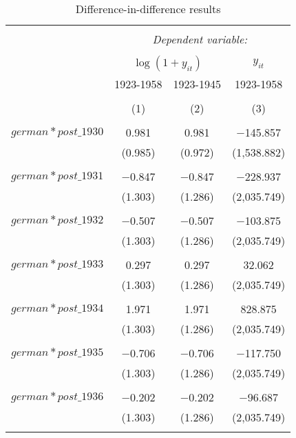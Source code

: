 
\begin{table}[!htbp] \centering 
  \caption{Difference-in-difference results} 
  \label{dif_table} 
\begin{tabular}{@{\extracolsep{5pt}}lccc} 
\\[-1.8ex]\hline 
\hline \\[-1.8ex] 
 & \multicolumn{3}{c}{\textit{Dependent variable:}} \\ 
\cline{2-4} 
\\[-1.8ex] & \multicolumn{2}{c}{$\log(1 + y_{it})$} & $y_{it}$ \\ 
 & 1923-1958 & 1923-1945 & 1923-1958 \\ 
\\[-1.8ex] & (1) & (2) & (3)\\ 
\hline \\[-1.8ex] 
 $german*post\_1930$ & 0.981 & 0.981 & $-$145.857 \\ 
  & (0.985) & (0.972) & (1,538.882) \\ 
  & & & \\ 
 $german*post\_1931$ & $-$0.847 & $-$0.847 & $-$228.937 \\ 
  & (1.303) & (1.286) & (2,035.749) \\ 
  & & & \\ 
 $german*post\_1932$ & $-$0.507 & $-$0.507 & $-$103.875 \\ 
  & (1.303) & (1.286) & (2,035.749) \\ 
  & & & \\ 
 $german*post\_1933$ & 0.297 & 0.297 & 32.062 \\ 
  & (1.303) & (1.286) & (2,035.749) \\ 
  & & & \\ 
 $german*post\_1934$ & 1.971 & 1.971 & 828.875 \\ 
  & (1.303) & (1.286) & (2,035.749) \\ 
  & & & \\ 
 $german*post\_1935$ & $-$0.706 & $-$0.706 & $-$117.750 \\ 
  & (1.303) & (1.286) & (2,035.749) \\ 
  & & & \\ 
 $german*post\_1936$ & $-$0.202 & $-$0.202 & $-$96.687 \\ 
  & (1.303) & (1.286) & (2,035.749) \\ 
  & & & \\ 

\end{tabular}
\end{table}
